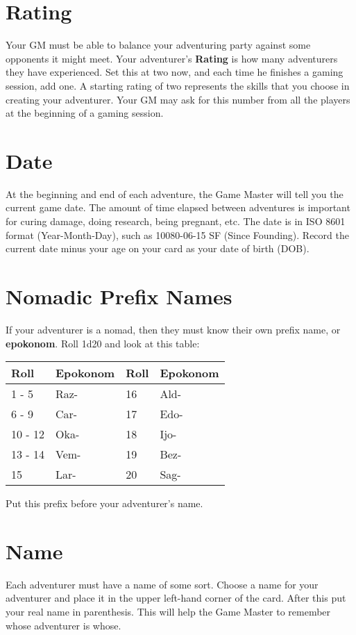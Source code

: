 \begin{multicols}{2}
\section{Rating}
Your GM must be able to balance your adventuring party against some opponents it might meet. Your adventurer's \textbf{Rating} is how many adventurers they have experienced. Set this at two now, and each time he finishes a gaming session, add one. A starting rating of two represents the skills that you choose in creating your adventurer. Your GM may ask for this number from all the players at the beginning of a gaming session.
\section{Date}
At the beginning and end of each adventure, the Game Master will tell you the current game date. The amount of time elapsed between adventures is important for curing damage, doing research, being pregnant, etc. The date is in ISO 8601 format (Year-Month-Day), such as 10080-06-15 SF (Since Founding). Record the current date minus your age on your card as your date of birth (DOB).
\section{Nomadic Prefix Names}
If your adventurer is a nomad, then they must know their own prefix name, or \textbf{epokonom}. Roll 1d20 and look at this table:
\begin{tcolorbox}[breakable,boxrule=0pt]
\begin{tabular}{l l|l l}
Roll & Epokonom & Roll & Epokonom\\
\midrule
1 - 5 & Raz- & 16 & Ald-\\
6 - 9 & Car- & 17 & Edo-\\
10 - 12 & Oka- & 18 & Ijo-\\
13 - 14 & Vem- & 19 & Bez-\\
15 & Lar- & 20 & Sag-\\
\end{tabular}
\end{tcolorbox}
Put this prefix before your adventurer’s name.
\section{Name}
Each adventurer must have a name of some sort. Choose a name for your adventurer and place it in the upper left-hand corner of the card. After this put your real name in parenthesis. This will help the Game Master to remember whose adventurer is whose.

\end{multicols}
